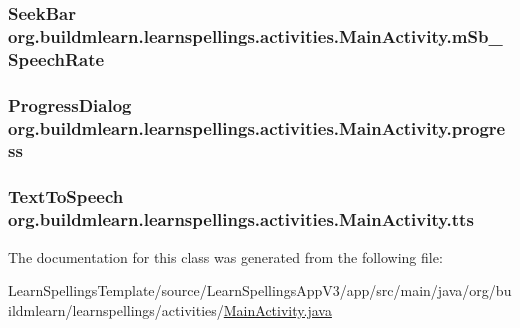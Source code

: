 \subsubsection[{\texorpdfstring{m\+Sb\+\_\+\+Speech\+Rate}{mSb_SpeechRate}}]{\setlength{\rightskip}{0pt plus 5cm}Seek\+Bar org.\+buildmlearn.\+learnspellings.\+activities.\+Main\+Activity.\+m\+Sb\+\_\+\+Speech\+Rate\hspace{0.3cm}{\ttfamily [private]}}\hypertarget{classorg_1_1buildmlearn_1_1learnspellings_1_1activities_1_1MainActivity_a9e70bb40aa131c1de782a7e470921edb}{}\label{classorg_1_1buildmlearn_1_1learnspellings_1_1activities_1_1MainActivity_a9e70bb40aa131c1de782a7e470921edb}
\subsubsection[{\texorpdfstring{progress}{progress}}]{\setlength{\rightskip}{0pt plus 5cm}Progress\+Dialog org.\+buildmlearn.\+learnspellings.\+activities.\+Main\+Activity.\+progress\hspace{0.3cm}{\ttfamily [private]}}\hypertarget{classorg_1_1buildmlearn_1_1learnspellings_1_1activities_1_1MainActivity_a6dc6e0047ade775628ffcef1ebf466f6}{}\label{classorg_1_1buildmlearn_1_1learnspellings_1_1activities_1_1MainActivity_a6dc6e0047ade775628ffcef1ebf466f6}
\subsubsection[{\texorpdfstring{tts}{tts}}]{\setlength{\rightskip}{0pt plus 5cm}Text\+To\+Speech org.\+buildmlearn.\+learnspellings.\+activities.\+Main\+Activity.\+tts\hspace{0.3cm}{\ttfamily [private]}}\hypertarget{classorg_1_1buildmlearn_1_1learnspellings_1_1activities_1_1MainActivity_a7f94f1a4a1805382777e2ca757778c98}{}\label{classorg_1_1buildmlearn_1_1learnspellings_1_1activities_1_1MainActivity_a7f94f1a4a1805382777e2ca757778c98}


The documentation for this class was generated from the following file\+:\begin{DoxyCompactItemize}
\item 
Learn\+Spellings\+Template/source/\+Learn\+Spellings\+App\+V3/app/src/main/java/org/buildmlearn/learnspellings/activities/\hyperlink{LearnSpellingsTemplate_2source_2LearnSpellingsAppV3_2app_2src_2main_2java_2org_2buildmlearn_2lea467f2fc2ddaf76cbe39ef028ec0293ec}{Main\+Activity.\+java}\end{DoxyCompactItemize}

